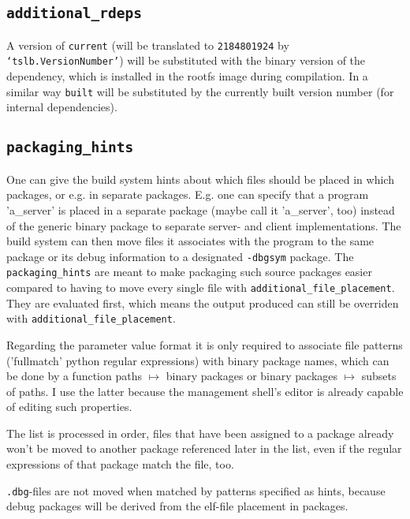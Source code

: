 \documentclass[a4paper]{scrartcl}
\newcommand{\file}[1]{\texttt{#1}}
\newcommand{\python}[1]{\texttt{`#1'}}
\begin{document}
	\subsection{\texttt{additional\_rdeps}}
	\label{sec:additional_rdeps}
	
	A version of \texttt{current} (will be translated to \texttt{2184801924} by \python{tslb.VersionNumber}) will be substituted with the binary version of the dependency, which is installed in the rootfs image during compilation. In a similar way \texttt{built} will be substituted by the currently built version number (for internal dependencies).
	
	\subsection{\texttt{packaging\_hints}}
	\label{sec:packaging_hints}
	
	One can give the build system hints about which files should be placed in which packages, or e.g. in separate packages. E.g. one can specify that a program 'a\_server' is placed in a separate package (maybe call it 'a\_server', too) instead of the generic binary package to separate server- and client implementations. The build system can then move files it associates with the program to the same package or its debug information to a designated \texttt{-dbgsym} package. The \texttt{packaging\_hints} are meant to make packaging such source packages easier compared to having to move every single file with \texttt{additional\_file\_placement}. They are evaluated first, which means the output produced can still be overriden with \texttt{additional\_file\_placement}.
	
	Regarding the parameter value format it is only required to associate file patterns ('fullmatch' python regular expressions) with binary package names, which can be done by a function paths $\mapsto$ binary packages or binary packages $\mapsto$ subsets of paths. I use the latter because the management shell's editor is already capable of editing such properties.
	
	The list is processed in order, files that have been assigned to a package already won't be moved to another package referenced later in the list, even if the regular expressions of that package match the file, too.
	
	\file{.dbg}-files are not moved when matched by patterns specified as hints, because debug packages will be derived from the elf-file placement in packages.
	
\end{document}

